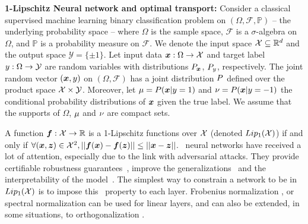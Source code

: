 \textbf{1-Lipschitz Neural network and optimal transport:}
%
Consider a classical supervised machine learning binary classification problem on $(\Omega, \mathcal{F}, \mathbb{P})$ -- the underlying probability space -- where $\Omega$ is the sample space, $\mathcal{F}$ is a $\sigma$-algebra on $\Omega$, and $\mathbb{P}$ is a probability measure on $\mathcal{F}$. 
%
We denote the input space $\mathcal{X} \subseteq \mathbb{R}^d$ and the output space $\mathcal{Y} = \{\pm 1 \}$. Let input data $\bm{x} : \Omega \to \mathcal{X}$ and target label $y : \Omega \to \mathcal{Y}$ are random variables with distributions $P_{\bm{x}}$, $P_{y}$, respectively.
%
The joint random vector $(\bm{x}, y)$ on $(\Omega, \mathcal{F})$ has a joint distribution $P$ defined over the product space $\mathcal{X} \times \mathcal{Y}$.
%
Moreover, let $\mu = P(\bm{x} | y = 1)$ and $\nu = P(\bm{x} | y = -1)$ the conditional probability distributions of $\bm{x}$ given
the true label.
We assume that the supports of $\Omega$,  $\mu$ and $\nu$ are compact sets.


A function $\bm{f} :\mathcal{X} \to \mathbb{R}$ is a 1-Lipschitz functions over $\mathcal{X}$ (denoted $Lip_1(\mathcal{X})$) if and only if $\forall (\bm{x},\bm{z}) \in \mathcal{X}^2, ||\bm{f}(\bm{x}) -\bm{f}(\bm{z}) ||\leq || \bm{x}-\bm{z}||$.
\onlyonelip~neural networks have received a lot of attention, especially due to the link with adversarial attacks. They provide certifiable robustness guarantees~\cite{hein_formal_2017,ono_lightweight_2018}, improve  the generalizations~\cite{Sokolic_2017} and the interpretability of the model~\cite{tsipras2018robustness}. The simplest way to constrain a network to be in $Lip_1(\mathcal{X})$ is to impose this \onlyonelip~property to each layer. Frobenius normalization \cite{SalimansK16}, or spectral normalization \cite{Miyato2018SpectralNF} can be used for linear layers, and can also be extended, in some situations, to  orthogonalization \cite{li2019preventing,Achour2021,TrockmanK21,araujo2023a}. 

